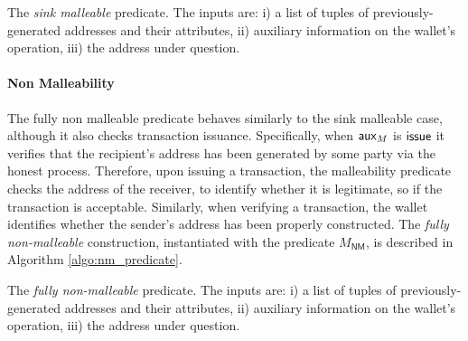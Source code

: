 \begin{algorithm}
    \caption{The \emph{sink malleable} predicate. The inputs are: i) a list of tuples of previously-generated addresses and their attributes, ii) auxiliary information on the wallet's operation, iii) the address under question.}\label{algo:sm_predicate}
    \begin{algorithmic}
                    \State {}
                \EndCase
                        \State {}
                    \EndIf
                \EndCase
            \EndSwitch
            \State {}
        \EndFunction
    \end{algorithmic}
\end{algorithm}

\paragraph{Non Malleability}
The fully non malleable predicate behaves similarly to the sink malleable case,
although it also checks transaction issuance.  Specifically, when $\mathsf{aux}_M$ is
$\mathsf{issue}$ it verifies that the recipient's address has been generated by some
party via the honest process. Therefore, upon issuing a transaction, the
malleability predicate checks the address of the receiver, to identify whether
it is legitimate, so if the transaction is acceptable. Similarly, when
verifying a transaction, the wallet identifies whether the sender's address has
been properly constructed. The \emph{fully non-malleable} construction,
instantiated with the predicate $M_{\mathsf{NM}}$, is described in Algorithm
\ref{algo:nm_predicate}.

\begin{algorithm}
    \caption{The \emph{fully non-malleable} predicate. The inputs are: i) a list of tuples of previously-generated addresses and their attributes, ii) auxiliary information on the wallet's operation, iii) the address under question.}\label{algo:nm_predicate}
    \begin{algorithmic}
                        \State {}
                    \EndIf
                \EndCase
                        \State {}
                    \EndIf
                \EndCase
            \EndSwitch
            \State {}
        \EndFunction
    \end{algorithmic}
\end{algorithm}

